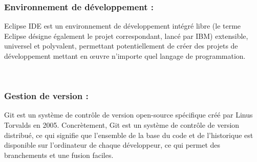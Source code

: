 \documentclass{article}
\begin{document}
{\subsubsection{Environnement de développement : }
\begin{minipage}{0.15\textwidth}
	\begin{minipage}{\linewidth}
	\end{minipage}
\end{minipage}
\hfill
\begin{minipage}{0.75\textwidth}
\vspace{0.5cm}
	Eclipse IDE est un environnement de développement intégré libre (le terme Eclipse désigne également le projet correspondant, lancé par IBM) extensible, universel et polyvalent, permettant potentiellement de créer des projets de développement mettant en œuvre n'importe quel langage de programmation.\\
\end{minipage}\\

\subsubsection{Gestion de version : }
\begin{minipage}{0.15\textwidth}
	\begin{minipage}{\linewidth}
	\end{minipage}
\end{minipage}
\hfill
\begin{minipage}{0.75\textwidth}
\vspace{0.5cm}
	Git est un système de contrôle de version open-source spécifique créé par Linus Torvalds en 2005.
Concrètement, Git est un système de contrôle de version distribué, ce qui signifie que l’ensemble de la base du code et de l’historique est disponible sur l’ordinateur de chaque développeur, ce qui permet des branchements et une fusion faciles.\\
\end{minipage}\\

}
\end{document}
